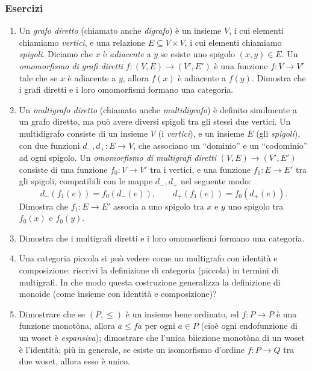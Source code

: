 \subsubsection*{Esercizi}
\begin{enumerate}
	\color{red}
	\item Un \emph{grafo diretto} (chiamato anche \emph{digrafo}) è un insieme \(V\), i cui elementi chiamiamo \emph{vertici}, e una relazione \(E\subseteq V\times V\), i cui elementi chiamiamo \emph{spigoli}. Diciamo che \(x\) è \emph{adiacente} a \(y\) se esiste uno spigolo \((x,y)\in E\). Un \emph{omomorfismo di grafi diretti} \(f:(V,E)\to (V',E')\) è una funzione \(f:V\to V'\) tale che se \(x\) è adiacente a \(y\), allora \(f(x)\) è adiacente a \(f(y)\). Dimostra che i grafi diretti e i loro omomorfismi formano una categoria.
	\item Un \emph{multigrafo diretto} (chiamato anche \emph{multidigrafo}) è definito similmente a un grafo diretto, ma può avere diversi spigoli tra gli stessi due vertici. Un multidigrafo consiste di un insieme \(V\) (i \emph{vertici}), e un insieme \(E\) (gli \emph{spigoli}), con due funzioni \(d_-,d_+:E\to V\), che associano un ``dominio'' e un ``codominio'' ad ogni spigolo. Un \emph{omomorfismo di multigrafi diretti} \((V,E)\to (V',E')\) consiste di una funzione \(f_0:V\to V'\) tra i vertici, e una funzione \(f_1:E\to E'\) tra gli spigoli, compatibili con le mappe \(d_-,d_+\) nel seguente modo:
	      \[
		      d_-(f_1(e)) = f_0(d_-(e)) ,\qquad d_+(f_1(e)) = f_0(d_+(e)) .
	      \]
	      Dimostra che \(f_1:E\to E'\) associa a uno spigolo tra \(x\) e \(y\) uno spigolo tra \(f_0(x)\) e \(f_0(y)\).
	\item Dimostra che i multigrafi diretti e i loro omomorfismi formano una categoria.
	\color{black}
	\item Una categoria piccola si può vedere come un multigrafo con identità e composizione: riscrivi la definizione di categoria (piccola) in termini di multigrafi.  In che modo questa costruzione generalizza la definizione di monoide (come insieme con identità e composizione)?
	\item Dimostrare che  se \((P,\le)\) è un insieme bene ordinato, ed \(f : P\to P\) è una funzione monotòna, allora \(a\le fa\) per ogni \(a\in P\) (cioè ogni endofunzione di un woset è \emph{espansiva}); dimostrare che l'unica biiezione monotòna di un woset è l'identità; più in generale, se esiste un isomorfismo d'ordine \(f : P\to Q\) tra due woset, allora esso è unico.
\end{enumerate}

